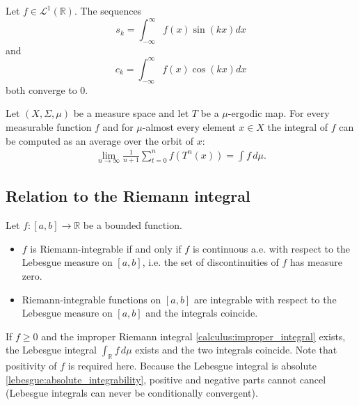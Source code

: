     \begin{theorem}\label{lebesgue:riemann_lebesue_lemma}
        Let $f\in\mathcal{L}^1(\mathbb{R})$. The sequences \[s_k = \int_{-\infty}^\infty f(x)\sin(kx)dx\] and \[c_k = \int_{-\infty}^\infty f(x)\cos(kx)dx\] both converge to 0.
    \end{theorem}

    \begin{theorem}\label{lebesgue:ergodic}
        Let $(X,\Sigma,\mu)$ be a measure space and let $T$ be a $\mu$-ergodic map. For every measurable function $f$ and for $\mu$-almost every element $x\in X$ the integral of $f$ can be computed as an average over the orbit of $x$:
        \begin{gather}
            \lim_{n\rightarrow\infty}\frac{1}{n+1}\sum_{t=0}^nf(T^n(x)) = \int f\,d\mu.
        \end{gather}
    \end{theorem}

\subsection{Relation to the Riemann integral}

    \begin{property}
        Let $f:[a,b]\rightarrow\mathbb{R}$ be a bounded function.
        \begin{itemize}
            \item $f$ is Riemann-integrable if and only if $f$ is continuous a.e. with respect to the Lebesgue measure on $[a,b]$, i.e. the set of discontinuities of $f$ has measure zero.
            \item Riemann-integrable functions on $[a,b]$ are integrable with respect to the Lebesgue measure on $[a,b]$ and the integrals coincide.
        \end{itemize}
    \end{property}

    \begin{property}
        If $f\geq0$ and the improper Riemann integral \ref{calculus:improper_integral} exists, the Lebesgue integral $\int_\mathbb{R}f\,d\mu$ exists and the two integrals coincide. Note that positivity of $f$ is required here. Because the Lebesgue integral is absolute \ref{lebesgue:absolute_integrability}, positive and negative parts cannot cancel (Lebesgue integrals can never be conditionally convergent).
    \end{property}

